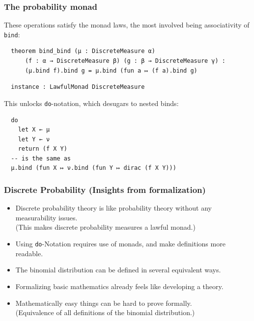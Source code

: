 \documentclass[11pt,aspectratio=169]{beamer}
\newcommand{\leanline}[1]{\texttt{#1}}%
\begin{document}
\begin{frame}[fragile]
  \frametitle{The probability monad}

  These operations satisfy the monad laws, the most involved being
  associativity of \leanline{bind}:

  \begin{verbatim}
  theorem bind_bind (μ : DiscreteMeasure α)
      (f : α → DiscreteMeasure β) (g : β → DiscreteMeasure γ) :
      (μ.bind f).bind g = μ.bind (fun a ↦ (f a).bind g)
  \end{verbatim}

  \begin{verbatim}
  instance : LawfulMonad DiscreteMeasure
  \end{verbatim}

  This unlocks \leanline{do}-notation, which desugars to nested binds:

  \begin{verbatim}
  do
    let X ← μ
    let Y ← ν
    return (f X Y)
  -- is the same as
  μ.bind (fun X ↦ ν.bind (fun Y ↦ dirac (f X Y)))
  \end{verbatim}
\end{frame}

\begin{frame}
  \frametitle{Discrete Probability (Insights from formalization)}
  \begin{itemize}
  \item Discrete probability theory is like probability theory without any measurability issues.\\
  (This makes discrete probability measures a lawful monad.)
  \item Using \leanline{do}-Notation requires use of monads, and make definitions more readable.
  \item The binomial distribution can be defined in several equivalent ways. 
  \item Formalizing basic mathematics already feels like developing a theory. 
  \item Mathematically easy things can be hard to prove formally. \\
    (Equivalence of all definitions of the binomial distribution.)
\end{itemize}

\end{frame}
\end{document}
